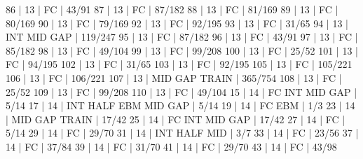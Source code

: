 86    |  13    |    FC                                        | 43/91   
87    |  13    |    FC                                        | 87/182   
88    |  13    |    FC                                        | 81/169   
89    |  13    |    FC                                        | 80/169   
90    |  13    |    FC                                        | 79/169   
92    |  13    |    FC                                        | 92/195   
93    |  13    |    FC                                        | 31/65   
94    |  13    |        INT                  MID  GAP         | 119/247   
95    |  13    |    FC                                        | 87/182   
96    |  13    |    FC                                        | 43/91   
97    |  13    |    FC                                        | 85/182   
98    |  13    |    FC                                        | 49/104   
99    |  13    |    FC                                        | 99/208   
100   |  13    |    FC                                        | 25/52   
101   |  13    |    FC                                        | 94/195   
102   |  13    |    FC                                        | 31/65   
103   |  13    |    FC                                        | 92/195   
105   |  13    |    FC                                        | 105/221   
106   |  13    |    FC                                        | 106/221   
107   |  13    |                             MID  GAP  TRAIN  | 365/754   
108   |  13    |    FC                                        | 25/52   
109   |  13    |    FC                                        | 99/208   
110   |  13    |    FC                                        | 49/104   
15    |  14    |    FC  INT                  MID  GAP         | 5/14   
17    |  14    |        INT  HALF  EBM       MID  GAP         | 5/14   
19    |  14    |    FC             EBM                        | 1/3   
23    |  14    |                             MID  GAP  TRAIN  | 17/42   
25    |  14    |    FC  INT                  MID  GAP         | 17/42   
27    |  14    |    FC                                        | 5/14   
29    |  14    |    FC                                        | 29/70   
31    |  14    |        INT  HALF            MID              | 3/7   
33    |  14    |    FC                                        | 23/56   
37    |  14    |    FC                                        | 37/84   
39    |  14    |    FC                                        | 31/70   
41    |  14    |    FC                                        | 29/70   
43    |  14    |    FC                                        | 43/98   
